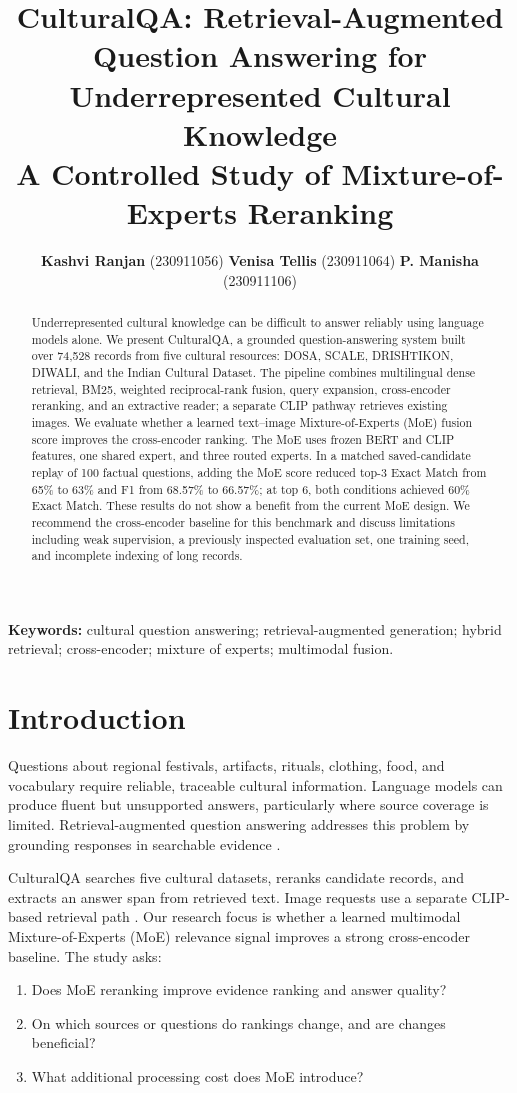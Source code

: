 \documentclass[10pt,a4paper]{article}
\title{\textbf{CulturalQA: Retrieval-Augmented Question Answering for Underrepresented Cultural Knowledge}\\
\large A Controlled Study of Mixture-of-Experts Reranking}
\author{
\small
\begin{tabular}[t]{c}
\textbf{Kashvi Ranjan} (230911056) \quad
\textbf{Venisa Tellis} (230911064) \quad
\textbf{P. Manisha} (230911106)
\end{tabular}
}
\date{}
\begin{document}
\maketitle

\begin{abstract}
Underrepresented cultural knowledge can be difficult to answer reliably using language models alone. We present CulturalQA, a grounded question-answering system built over 74,528 records from five cultural resources: DOSA, SCALE, DRISHTIKON, DIWALI, and the Indian Cultural Dataset. The pipeline combines multilingual dense retrieval, BM25, weighted reciprocal-rank fusion, query expansion, cross-encoder reranking, and an extractive reader; a separate CLIP pathway retrieves existing images. We evaluate whether a learned text--image Mixture-of-Experts (MoE) fusion score improves the cross-encoder ranking. The MoE uses frozen BERT and CLIP features, one shared expert, and three routed experts. In a matched saved-candidate replay of 100 factual questions, adding the MoE score reduced top-3 Exact Match from 65\% to 63\% and F1 from 68.57\% to 66.57\%; at top 6, both conditions achieved 60\% Exact Match. These results do not show a benefit from the current MoE design. We recommend the cross-encoder baseline for this benchmark and discuss limitations including weak supervision, a previously inspected evaluation set, one training seed, and incomplete indexing of long records.
\end{abstract}

\noindent\textbf{Keywords:} cultural question answering; retrieval-augmented generation; hybrid retrieval; cross-encoder; mixture of experts; multimodal fusion.

\section{Introduction}
Questions about regional festivals, artifacts, rituals, clothing, food, and vocabulary require reliable, traceable cultural information. Language models can produce fluent but unsupported answers, particularly where source coverage is limited. Retrieval-augmented question answering addresses this problem by grounding responses in searchable evidence \cite{rag}.

CulturalQA searches five cultural datasets, reranks candidate records, and extracts an answer span from retrieved text. Image requests use a separate CLIP-based retrieval path \cite{clip}. Our research focus is whether a learned multimodal Mixture-of-Experts (MoE) relevance signal improves a strong cross-encoder baseline. The study asks:
\begin{enumerate}
\item Does MoE reranking improve evidence ranking and answer quality?
\item On which sources or questions do rankings change, and are changes beneficial?
\item What additional processing cost does MoE introduce?
\end{enumerate}
\end{document}
